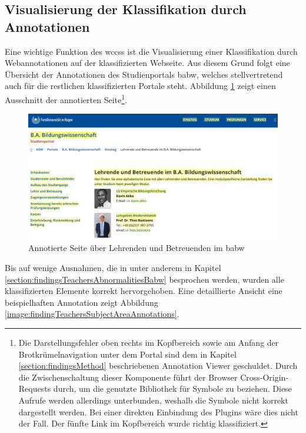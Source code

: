 \subsection{Visualisierung der Klassifikation durch Annotationen}
    Eine wichtige Funktion des \glspl{wccs}
    ist die Visualisierung einer Klassifikation durch Webannotationen
    auf der klassifizierten Webseite.
    Aus diesem Grund folgt eine Übersicht der Annotationen
    des Studienportals \gls{babw},
    welches stellvertretend auch für die restlichen klassifizierten Portale steht.
    Abbildung \ref{image:findingTeachersAnnotationsOverview}
    zeigt einen Ausschnitt der annotierten
    Seite\footnote{Die Darstellungsfehler oben rechts im Kopfbereich
    sowie am Anfang der Brotkrümelnavigation unter dem Portal
    sind dem in Kapitel \ref{section:findingsMethod} beschriebenen
    Annotation Viewer geschuldet.
    Durch die Zwischenschaltung dieser Komponente
    führt der Browser Cross-Origin-Requests durch,
    um die genutzte Bibliothek für Symbole zu beziehen.
    Diese Aufrufe werden allerdings unterbunden,
    weshalb die Symbole nicht korrekt dargestellt werden.
    Bei einer direkten Einbindung des Plugins wäre dies nicht der Fall.
    Der fünfte Link im Kopfbereich wurde richtig klassifiziert.}.

    \begin{figure}[htb]
        \centering
        \includegraphics[width=\textwidth]{../resources/findings/case-study-1/babw/annotations/overview.png}
        \caption{Annotierte Seite über Lehrenden und Betreuenden im \acrshort{babw}}
        \label{image:findingTeachersAnnotationsOverview}
    \end{figure}

    Bis auf wenige Ausnahmen, die in unter anderem in
    Kapitel \ref{section:findingsTeachersAbnormalitiesBabw} besprochen werden,
    wurden alle klassifizierten Elemente korrekt hervorgehoben.
    Eine detaillierte Ansicht eine beispielhaften Annotation zeigt
    Abbildung \ref{image:findingTeachersSubjectAreaAnnotations}.


